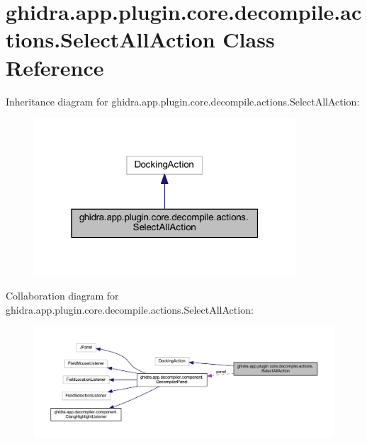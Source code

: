 \hypertarget{classghidra_1_1app_1_1plugin_1_1core_1_1decompile_1_1actions_1_1_select_all_action}{}\section{ghidra.\+app.\+plugin.\+core.\+decompile.\+actions.\+Select\+All\+Action Class Reference}
\label{classghidra_1_1app_1_1plugin_1_1core_1_1decompile_1_1actions_1_1_select_all_action}


Inheritance diagram for ghidra.\+app.\+plugin.\+core.\+decompile.\+actions.\+Select\+All\+Action\+:
\nopagebreak
\begin{figure}[H]
\begin{center}
\leavevmode
\includegraphics[width=277pt]{classghidra_1_1app_1_1plugin_1_1core_1_1decompile_1_1actions_1_1_select_all_action__inherit__graph}
\end{center}
\end{figure}


Collaboration diagram for ghidra.\+app.\+plugin.\+core.\+decompile.\+actions.\+Select\+All\+Action\+:
\nopagebreak
\begin{figure}[H]
\begin{center}
\leavevmode
\includegraphics[width=350pt]{classghidra_1_1app_1_1plugin_1_1core_1_1decompile_1_1actions_1_1_select_all_action__coll__graph}
\end{center}
\end{figure}
